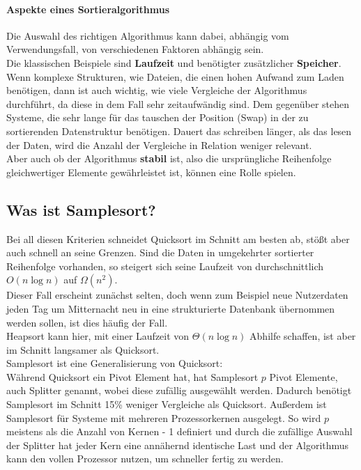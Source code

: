 		\paragraph{Aspekte eines Sortieralgorithmus}
			Die Auswahl des richtigen Algorithmus kann dabei, abhängig vom Verwendungsfall, von verschiedenen Faktoren abhängig sein.\\
			Die klassischen Beispiele sind \textbf{Laufzeit} und benötigter zusätzlicher \textbf{Speicher}.
			Wenn komplexe Strukturen, wie Dateien, die einen hohen Aufwand zum Laden benötigen, dann ist auch wichtig, wie viele Vergleiche der Algorithmus durchführt, da diese in dem Fall sehr zeitaufwändig sind.
			Dem gegenüber stehen Systeme, die sehr lange für das tauschen der Position (Swap) in der zu sortierenden Datenstruktur benötigen.
			Dauert das schreiben länger, als das lesen der Daten, wird die Anzahl der Vergleiche in Relation weniger relevant.\\
			Aber auch ob der Algorithmus \textbf{stabil} ist, also die ursprüngliche Reihenfolge gleichwertiger Elemente gewährleistet ist, können eine Rolle spielen.\\
			

	\subsection{Was ist Samplesort?}
		Bei all diesen Kriterien schneidet Quicksort im Schnitt am besten ab, stößt aber auch schnell an seine Grenzen. Sind die Daten in umgekehrter sortierter Reihenfolge vorhanden, so steigert sich seine Laufzeit von durchschnittlich $O(n\log{n})$ auf $\Omega(n^2)$.\\
		Dieser Fall erscheint zunächst selten, doch wenn zum Beispiel neue Nutzerdaten jeden Tag um Mitternacht neu in eine strukturierte Datenbank übernommen werden sollen, ist dies häufig der Fall.\\
		Heapsort kann hier, mit einer Laufzeit von $\Theta(n\log{n})$ Abhilfe schaffen, ist aber im Schnitt langsamer als Quicksort.\\
		Samplesort ist eine Generalisierung von Quicksort:\\
		Während Quicksort ein Pivot Element hat, hat Samplesort $p$ Pivot Elemente, auch Splitter genannt, wobei diese zufällig ausgewählt werden.
		Dadurch benötigt Samplesort im Schnitt 15\% weniger Vergleiche als Quicksort. \autocite{frazer-1970}
		Außerdem ist Samplesort für Systeme mit mehreren Prozessorkernen ausgelegt.
		So wird $p$ meistens als die Anzahl von Kernen - 1 definiert und durch die zufällige Auswahl der Splitter hat jeder Kern eine annähernd identische Last und der Algorithmus kann den vollen Prozessor nutzen, um schneller fertig zu werden.\\
